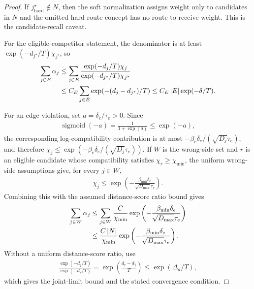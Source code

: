 \begin{proof}
If $j^\star_{\mathrm{hard}}\notin N$, then the soft normalization assigns weight only to candidates in $N$ and the omitted hard-route concept has no route to receive weight. This is the candidate-recall caveat.

For the eligible-competitor statement, the denominator is at least $\exp(-d_{j^\star}/T)\chi_{j^\star}$, so
\begin{align*}
\sum_{j\in E}\alpha_j
&\le
\sum_{j\in E}
\frac{\exp(-d_j/T)\chi_j}
{\exp(-d_{j^\star}/T)\chi_{j^\star}}\\
&\le C_E\sum_{j\in E}\exp(-(d_j-d_{j^\star})/T)
\le C_E\left\lvert E\right\rvert\exp(-\delta/T).
\end{align*}

For an edge violation, set $a=\delta_e/\tau_e>0$. Since
\begin{align*}
\operatorname{sigmoid}(-a)=\frac{1}{1+\exp(a)}\le \exp(-a),
\end{align*}
the corresponding log-compatibility contribution is at most $-\beta_e\delta_e/(\sqrt{D_j}\tau_e)$, and therefore $\chi_j\le \exp(-\beta_e\delta_e/(\sqrt{D_j}\tau_e))$. If $W$ is the wrong-side set and $r$ is an eligible candidate whose compatibility satisfies $\chi_r\ge\chi_{\min}$, the uniform wrong-side assumptions give, for every $j\in W$,
\begin{align*}
\chi_j\le
\exp\left(-\frac{\beta_{\min}\delta_e}{\sqrt{D_{\max}}\tau_e}\right).
\end{align*}
Combining this with the assumed distance-score ratio bound gives
\begin{align*}
\sum_{j\in W}\alpha_j
&\le \sum_{j\in W} \frac{C}{\chi_{\min}}
\exp\left(-\frac{\beta_{\min}\delta_e}{\sqrt{D_{\max}}\tau_e}\right)\\
&\le \frac{C\left\lvert N\right\rvert}{\chi_{\min}}
\exp\left(-\frac{\beta_{\min}\delta_e}{\sqrt{D_{\max}}\tau_e}\right).
\end{align*}
Without a uniform distance-score ratio, use
\begin{align*}
\frac{\exp(-d_j/T)}{\exp(-d_r/T)}
=
\exp\left(\frac{d_r-d_j}{T}\right)
\le
\exp(\Delta_d/T),
\end{align*}
which gives the joint-limit bound and the stated convergence condition.
\end{proof}

